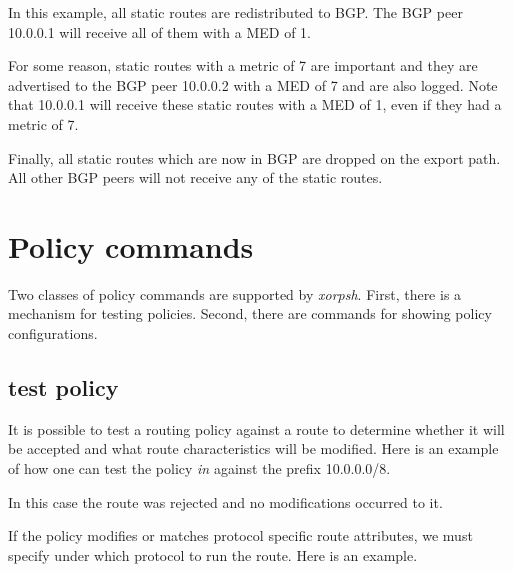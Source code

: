 In this example, all static routes are redistributed to BGP.  The BGP peer
10.0.0.1 will receive all of them with a MED of 1.  

For some reason, static routes with a metric of 7 are important and they are
advertised to the BGP peer 10.0.0.2 with a MED of 7 and are also logged.  Note
that 10.0.0.1 will receive these static routes with a MED of 1, even if they had
a metric of 7.

Finally, all static routes which are now in BGP are dropped on the export path.
All other BGP peers will not receive any of the static routes.

\section{Policy commands}
Two classes of policy commands are supported by {\em xorpsh}.  First, there is a
mechanism for testing policies.  Second, there are commands for showing policy
configurations.

\subsection{test policy}
It is possible to test a routing policy against a route to determine whether it
will be accepted and what route characteristics will be modified.  Here is an
example of how one can test the policy {\em in} against the prefix 10.0.0.0/8.

\noindent{}

In this case the route was rejected and no modifications occurred to it.  

If the policy modifies or matches protocol specific route attributes, we must
specify under which protocol to run the route.  Here is an example.

\noindent{}

